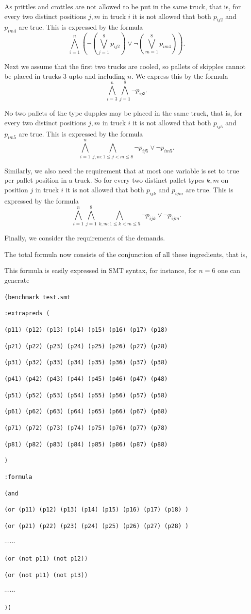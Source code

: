 \documentclass[a4paper]{article}
\begin{document}
	As prittles and crottles are not allowed to be put in the same truck, that is, for every two distinct positions $j,m$ in truck $i$ it is not allowed that both $p_{ij2}$ and $p_{im4}$ are true. This is expressed by the formula
\[ \bigwedge_{i=1}^n (\neg (\bigvee_{j=1}^8 p_{ij2}) \vee \neg (\bigvee_{m=1}^8 p_{im4})).\]

Next we assume that the first two trucks are cooled, so pallets of skipples cannot be placed in trucks 3 upto and including $n$. We express this by the formula
\[ \bigwedge_{i=3}^n \bigwedge_{j=1}^8 \neg p_{ij3}.\]

No two pallets of the type dupples may be placed in the same truck, that is, for every two distinct positions $j,m$ in truck $i$ it is not allowed that both $p_{ij5}$ and $p_{im5}$ are true. This is expressed by the formula
\[ \bigwedge_{i=1}^n \bigwedge_{j,m:1 \leq j < m \leq 8} \neg p_{ij5} \vee \neg p_{im5}.\]

Similarly, we also need the requirement that at most one variable is set to true per pallet position in a truck. So for every two distinct pallet types $k,m$ on position $j$ in truck $i$ it is not allowed that both $p_{ijk}$ and $p_{ijm}$ are true. This is expressed by the formula
\[ \bigwedge_{i=1}^n \bigwedge_{j=1}^8 \bigwedge_{k,m:1 \leq k < m \leq 5} \neg p_{ijk} \vee \neg p_{ijm}.\]

Finally, we consider the requirements of the demands.

The total formula now consists of the conjunction of all these ingredients, that is,


This formula is easily expressed in SMT syntax, for instance, for
$n=6$ one can generate

{\footnotesize

{\tt (benchmark test.smt}

{\tt :extrapreds (}

{\tt (p11) (p12) (p13) (p14) (p15) (p16) (p17) (p18) }

{\tt (p21) (p22) (p23) (p24) (p25) (p26) (p27) (p28) }

{\tt (p31) (p32) (p33) (p34) (p35) (p36) (p37) (p38) }

{\tt (p41) (p42) (p43) (p44) (p45) (p46) (p47) (p48) }

{\tt (p51) (p52) (p53) (p54) (p55) (p56) (p57) (p58) }

{\tt (p61) (p62) (p63) (p64) (p65) (p66) (p67) (p68) }

{\tt (p71) (p72) (p73) (p74) (p75) (p76) (p77) (p78) }

{\tt (p81) (p82) (p83) (p84) (p85) (p86) (p87) (p88) }

{\tt )}

{\tt :formula}

{\tt   (and}

{\tt (or (p11) (p12) (p13) (p14) (p15) (p16) (p17) (p18) )}

{\tt (or (p21) (p22) (p23) (p24) (p25) (p26) (p27) (p28) )}

$\cdots \cdots$

{\tt (or (not p11) (not p12)) }

{\tt (or (not p11) (not p13)) }

$\cdots \cdots$

{\tt )) }
}
\end{document}
